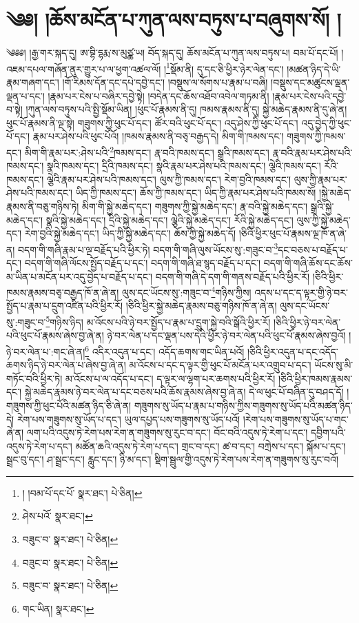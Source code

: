 \setcounter{footnote}{0} 
\chapter{༄༅། །ཆོས་མངོན་པ་ཀུན་ལས་བཏུས་པ་བཞུགས་སོ། །}༄༅༅། །རྒྱ་གར་སྐད་དུ། ཨ་བྷི་དྷརྨ་ས་མུཙྪ་ཡ། བོད་སྐད་དུ། ཆོས་མངོན་པ་ཀུན་ལས་བཏུས་པ། བམ་པོ་དང་པོ། །འཇམ་དཔལ་གཞོན་ནུར་གྱུར་པ་ལ་ཕྱག་འཚལ་ལོ། །\footnote{། །བམ་པོ་དང་པོ་  སྣར་ཐང་།  པེ་ཅིན། }སྡོམ་ནི། དུ་དང་ཅི་ཕྱིར་ཉེར་ལེན་དང་། །མཚན་ཉིད་དེ་ཡི་རྣམ་གཞག་དང་། །གོ་རིམས་དོན་དང་དཔེ་དབྱེ་དང་། །བསྡུས་ལ་སོགས་པ་རྣམ་པ་བཞི། །བསྡུས་དང་མཚུངས་ལྡན་ལྡན་པ་དང་། །རྣམ་པར་ངེས་པ་བཞིར་དབྱེ་སྟེ། །བདེན་དང་ཆོས་འཐོབ་འབེལ་གཏམ་ནི། །རྣམ་པར་ངེས་པའི་དབྱེ་བ་སྟེ། །ཀུན་ལས་བཏུས་པའི་སྤྱི་སྡོམ་ཡིན། །ཕུང་པོ་རྣམས་ནི་དུ། ཁམས་རྣམས་ནི་དུ། སྐྱེ་མཆེད་རྣམས་ནི་དུ་ཞེ་ན། ཕུང་པོ་རྣམས་ནི་ལྔ་སྟེ། གཟུགས་ཀྱི་ཕུང་པོ་དང་། ཚོར་བའི་ཕུང་པོ་དང་། འདུ་ཤེས་ཀྱི་ཕུང་པོ་དང་། འདུ་བྱེད་ཀྱི་ཕུང་པོ་དང་། རྣམ་པར་ཤེས་པའི་ཕུང་པོའོ། །ཁམས་རྣམས་ནི་བཅྭ་བརྒྱད་དེ། མིག་གི་ཁམས་དང་། གཟུགས་ཀྱི་ཁམས་དང་། མིག་གི་རྣམ་པར་:ཤེས་པའི་\footnote{ཤེས་པའོ་  སྣར་ཐང་། }ཁམས་དང་། རྣ་བའི་ཁམས་དང་། སྒྲའི་ཁམས་དང་། རྣ་བའི་རྣམ་པར་ཤེས་པའི་ཁམས་དང་། སྣའི་ཁམས་དང་། དྲིའི་ཁམས་དང་། སྣའི་རྣམ་པར་ཤེས་པའི་ཁམས་དང་། ལྕེའི་ཁམས་དང་། རོའི་ཁམས་དང་། ལྕེའི་རྣམ་པར་ཤེས་པའི་ཁམས་དང་། ལུས་ཀྱི་ཁམས་དང་། རེག་བྱའི་ཁམས་དང་། ལུས་ཀྱི་རྣམ་པར་ཤེས་པའི་ཁམས་དང་། ཡིད་ཀྱི་ཁམས་དང་། ཆོས་ཀྱི་ཁམས་དང་། ཡིད་ཀྱི་རྣམ་པར་ཤེས་པའི་ཁམས་སོ། །སྐྱེ་མཆེད་རྣམས་ནི་བཅུ་གཉིས་ཏེ། མིག་གི་སྐྱེ་མཆེད་དང་། གཟུགས་ཀྱི་སྐྱེ་མཆེད་དང་། རྣ་བའི་སྐྱེ་མཆེད་དང་། སྒྲའི་སྐྱེ་མཆེད་དང་། སྣའི་སྐྱེ་མཆེད་དང་། དྲིའི་སྐྱེ་མཆེད་དང་། ལྕེའི་སྐྱེ་མཆེད་དང་། རོའི་སྐྱེ་མཆེད་དང་། ལུས་ཀྱི་སྐྱེ་མཆེད་དང་། རེག་བྱའི་སྐྱེ་མཆེད་དང་། ཡིད་ཀྱི་སྐྱེ་མཆེད་དང་། ཆོས་ཀྱི་སྐྱེ་མཆེད་དོ། །ཅིའི་ཕྱིར་ཕུང་པོ་རྣམས་ལྔ་ཁོ་ན་ཞེ་ན། བདག་གི་གཞི་རྣམ་པ་ལྔ་བརྗོད་པའི་ཕྱིར་ཏེ། བདག་གི་གཞི་ལུས་ཡོངས་སུ་:གཟུང་བ་\footnote{བཟུང་བ་  སྣར་ཐང་།  པེ་ཅིན། }དང་བཅས་པ་བརྗོད་པ་དང་། བདག་གི་གཞི་ལོངས་སྤྱོད་བརྗོད་པ་དང་། བདག་གི་གཞི་ཐ་སྙད་བརྗོད་པ་དང་། བདག་གི་གཞི་ཆོས་དང་ཆོས་མ་ཡིན་པ་མངོན་པར་འདུ་བྱེད་པ་བརྗོད་པ་དང་། བདག་གི་གཞི་དེ་དག་གི་གནས་བརྗོད་པའི་ཕྱིར་རོ། །ཅིའི་ཕྱིར་ཁམས་རྣམས་བཅྭ་བརྒྱད་ཁོ་ན་ཞེ་ན། ལུས་དང་ཡོངས་སུ་:གཟུང་བ་\footnote{བཟུང་བ་  སྣར་ཐང་།  པེ་ཅིན། }གཉིས་ཀྱིས། འདས་པ་དང་ད་ལྟར་གྱི་ཉེ་བར་སྤྱོད་པ་རྣམ་པ་དྲུག་འཛིན་པའི་ཕྱིར་རོ། །ཅིའི་ཕྱིར་སྐྱེ་མཆེད་རྣམས་བཅུ་གཉིས་ཁོ་ན་ཞེ་ན། ལུས་དང་ཡོངས་སུ་:གཟུང་བ་\footnote{བཟུང་བ་  སྣར་ཐང་།  པེ་ཅིན། }གཉིས་ཉིད། མ་འོངས་པའི་ཉེ་བར་སྤྱོད་པ་རྣམ་པ་དྲུག་སྐྱེ་བའི་སྒོའི་ཕྱིར་རོ། །ཅིའི་ཕྱིར་ཉེ་བར་ལེན་པའི་ཕུང་པོ་རྣམས་ཞེས་བྱ་ཞེ་ན། ཉེ་བར་ལེན་པ་དང་ལྡན་པས་དེའི་ཕྱིར་ཉེ་བར་ལེན་པའི་ཕུང་པོ་རྣམས་ཞེས་བྱའོ། །ཉེ་བར་ལེན་པ་:གང་ཞེ་ན།\footnote{གང་ཡིན།  སྣར་ཐང་། } འདིར་འདུན་པ་དང་། འདོད་ཆགས་གང་ཡིན་པའོ། །ཅིའི་ཕྱིར་འདུན་པ་དང་འདོད་ཆགས་ཉིད་ཉེ་བར་ལེན་པ་ཞེས་བྱ་ཞེ་ན། མ་འོངས་པ་དང་ད་ལྟར་གྱི་ཕུང་པོ་མངོན་པར་འགྲུབ་པ་དང་། ཡོངས་སུ་མི་གཏོང་བའི་ཕྱིར་ཏེ། མ་འོངས་པ་ལ་འདོད་པ་དང་། ད་ལྟར་ལ་ལྷག་པར་ཆགས་པའི་ཕྱིར་རོ། །ཅིའི་ཕྱིར་ཁམས་རྣམས་དང་། སྐྱེ་མཆེད་རྣམས་ཉེ་བར་ལེན་པ་དང་བཅས་པའི་ཆོས་རྣམས་ཞེས་བྱ་ཞེ་ན། དེ་ལ་ཕུང་པོ་བཞིན་དུ་བཤད་དོ། །གཟུགས་ཀྱི་ཕུང་པོའི་མཚན་ཉིད་ཅི་ཞེ་ན། གཟུགས་སུ་ཡོད་པ་རྣམ་པ་གཉིས་ཀྱིས་གཟུགས་སུ་ཡོད་པའི་མཚན་ཉིད་དེ། རེག་པས་གཟུགས་སུ་ཡོད་པ་དང་། ཡུལ་དཔྱད་པས་གཟུགས་སུ་ཡོད་པའོ། །རེག་པས་གཟུགས་སུ་ཡོད་པ་གང་ཞེ་ན། ལག་པའི་འདུས་ཏེ་རེག་པས་རེག་ན་གཟུགས་སུ་རུང་བ་དང་། བོང་བའི་འདུས་ཏེ་རེག་པ་དང་། དབྱིག་པའི་འདུས་ཏེ་རེག་པ་དང་། མཚོན་ཆའི་འདུས་ཏེ་རེག་པ་དང་། གྲང་བ་དང་། ཚ་བ་དང་། བཀྲེས་པ་དང་། སྐོམ་པ་དང་། སྦྲང་བུ་དང་། ཤ་སྦྲང་དང་། རླུང་དང་། ཉི་མ་དང་། སྡིག་སྦྲུལ་གྱི་འདུས་ཏེ་རེག་པས་རེག་ན་གཟུགས་སུ་རུང་བའོ། 